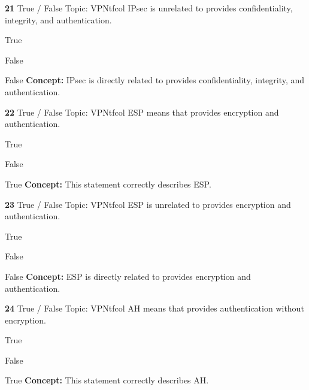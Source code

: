 \documentclass[10pt,a4paper]{article}
\begin{document}
\begin{qcard}{\color{white}\textbf{21} \hfill \small True / False \textbar{} Topic: VPN}{tfcol}
IPsec is unrelated to provides confidentiality, integrity, and authentication.

\begin{qoptions}
\item True
\item False
\end{qoptions}
\begin{explainbox}{False}
\textbf{Concept:} IPsec is directly related to provides confidentiality, integrity, and authentication.
\end{explainbox}
\end{qcard}

\begin{qcard}{\color{white}\textbf{22} \hfill \small True / False \textbar{} Topic: VPN}{tfcol}
ESP means that provides encryption and authentication.

\begin{qoptions}
\item True
\item False
\end{qoptions}
\begin{explainbox}{True}
\textbf{Concept:} This statement correctly describes ESP.
\end{explainbox}
\end{qcard}

\begin{qcard}{\color{white}\textbf{23} \hfill \small True / False \textbar{} Topic: VPN}{tfcol}
ESP is unrelated to provides encryption and authentication.

\begin{qoptions}
\item True
\item False
\end{qoptions}
\begin{explainbox}{False}
\textbf{Concept:} ESP is directly related to provides encryption and authentication.
\end{explainbox}
\end{qcard}

\begin{qcard}{\color{white}\textbf{24} \hfill \small True / False \textbar{} Topic: VPN}{tfcol}
AH means that provides authentication without encryption.

\begin{qoptions}
\item True
\item False
\end{qoptions}
\begin{explainbox}{True}
\textbf{Concept:} This statement correctly describes AH.
\end{explainbox}
\end{qcard}
\end{document}
